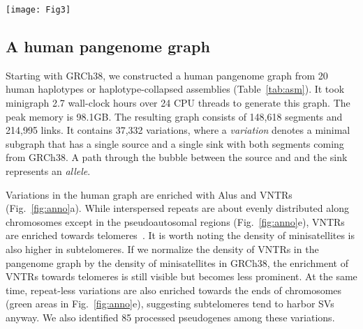 \documentclass[twocolumn]{bmcart}
\begin{document}
\begin{figure*}[htbp]
\texttt{[image: Fig3]}
\caption{ {\bf
  (a)} Human variations stratified by repeat class and by the number of
  alleles of each variation. The repeat annotation was obtained from the
  longest allele of each variation. VNTR: variable-number tandem repeat, a
  tandem repeat with the unit motif length $\ge$7bp. STR: short random repeat,
  a tandem repeat with the unit motif length $\le$6bp. LCR: low-complexity
  regions. Mixed-inter.: a variation involving $\ge$2 types of interspersed
  repeats. {\bf (b)} Great ape variations stratified by repeat class and by the
  number of alleles. {\bf (c)} Human biallelic variations stratified by repeat
  class and by insertion to/deletion from GRCh38. Both alleles are required to
  be covered in all assemblies. {\bf (d)} Human-specific biallelic variations
  stratified by repeat class and by insertion to/deletion from GRCh38. Red bars
  correspond to insertions to the human lineage. {\bf (e)} Distribution of
  different types of human variations along chromosomes.  {\bf (f)} Boxplot of
  the longest allele length in each repeat class. Outliers are omitted for the
  clarity of the figure.}\label{fig:anno}
\end{figure*}

\subsection*{A human pangenome graph}

Starting with GRCh38, we constructed a human pangenome graph from 20 human
haplotypes or haplotype-collapsed assemblies (Table~\ref{tab:asm}). It took
minigraph 2.7 wall-clock hours over 24 CPU threads to generate this graph. The
peak memory is 98.1GB. The resulting graph consists of 148,618 segments and
214,995 links. It contains 37,332 variations, where a \emph{variation}
denotes a minimal subgraph that has a single source and a single sink with both
segments coming from GRCh38. A path through the bubble between the source and
and the sink represents an \emph{allele}.

Variations in the human graph are enriched with Alus and VNTRs
(Fig.~\ref{fig:anno}a). While interspersed repeats are about evenly distributed
along chromosomes except in the pseudoautosomal regions (Fig.~\ref{fig:anno}e),
VNTRs are enriched towards telomeres~\cite{Audano:2019aa}. It is worth noting
the density of minisatellites is also higher in subtelomeres. If we normalize
the density of VNTRs in the pangenome graph by the density of minisatellites in
GRCh38, the enrichment of VNTRs towards telomeres is still visible but becomes
less prominent. At the same time, repeat-less variations are also enriched
towards the ends of chromosomes (green areas in Fig.~\ref{fig:anno}e),
suggesting subtelomeres tend to harbor SVs anyway. We also
identified 85 processed pseudogenes among these variations.
\end{document}

